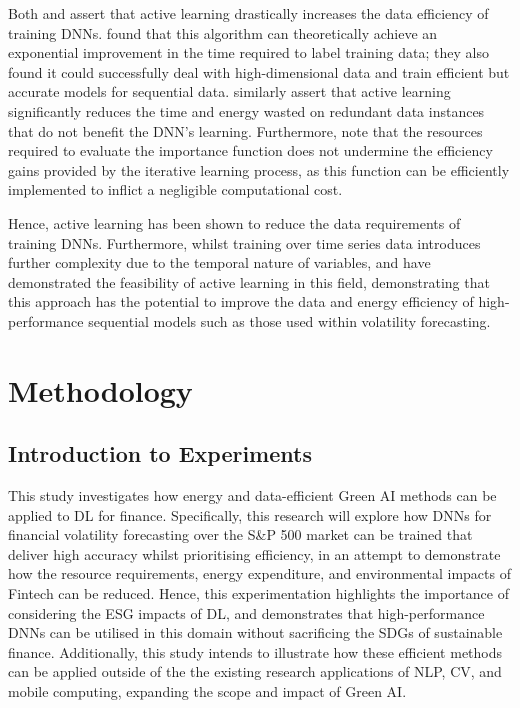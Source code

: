 \documentclass[a4paper, 11pt]{report}
\begin{document}
    Both \citet{ren-2021} and \citet{xu-2021} assert that active learning drastically increases the data efficiency of training DNNs. \citet{ren-2021} found that this algorithm can theoretically achieve an exponential improvement in the time required to label training data; they also found it could successfully deal with high-dimensional data and train efficient but accurate models for sequential data. \citet{xu-2021} similarly assert that active learning significantly reduces the time and energy wasted on redundant data instances that do not benefit the DNN's learning. Furthermore, \citet{ren-2021} note that the resources required to evaluate the importance function does not undermine the efficiency gains provided by the iterative learning process, as this function can be efficiently implemented to inflict a negligible computational cost. 

    Hence, active learning has been shown to reduce the data requirements of training DNNs. Furthermore, whilst training over time series data introduces further complexity due to the temporal nature of variables, \citet{peng-2017} and \citet{zimmer-2018} have demonstrated the feasibility of active learning in this field, demonstrating that this approach has the potential to improve the data and energy efficiency of high-performance sequential models such as those used within volatility forecasting.


    \newpage
    \chapter{Methodology}
    \label{chapter: experiments}

    \section{Introduction to Experiments}

    This study investigates how energy and data-efficient Green AI methods can be applied to DL for finance. Specifically, this research will explore how DNNs for financial volatility forecasting over the S\&P 500 market can be trained that deliver high accuracy whilst prioritising efficiency, in an attempt to demonstrate how the resource requirements, energy expenditure, and environmental impacts of Fintech can be reduced. Hence, this experimentation highlights the importance of considering the ESG impacts of DL, and demonstrates that high-performance DNNs can be utilised in this domain without sacrificing the SDGs of sustainable finance. Additionally, this study intends to illustrate how these efficient methods can be applied outside of the the existing research applications of NLP, CV, and mobile computing, expanding the scope and impact of Green AI.
\end{document}
